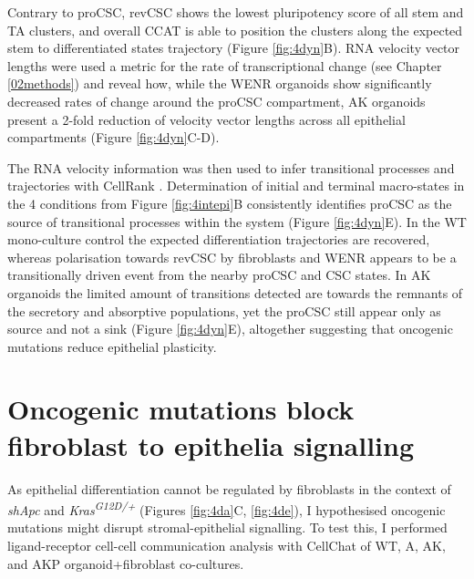 Contrary to proCSC, revCSC shows the lowest pluripotency score of all stem and TA clusters, and overall CCAT is able to position the clusters along the expected stem to differentiated states trajectory (Figure \ref{fig:4dyn}B). RNA velocity \cite{bergen_generalizing_2020} vector lengths were used a metric for the rate of transcriptional change (see Chapter \ref{02methods}) and reveal how, while the WENR organoids show significantly decreased rates of change around the proCSC compartment, AK organoids present a 2-fold reduction of velocity vector lengths across all epithelial compartments (Figure \ref{fig:4dyn}C-D).

The RNA velocity information was then used to infer transitional processes and trajectories with CellRank \cite{lange_cellrank_2022}. Determination of initial and terminal macro-states in the 4 conditions from Figure \ref{fig:4intepi}B consistently identifies proCSC as the source of transitional processes within the system (Figure \ref{fig:4dyn}E). In the WT mono-culture control the expected differentiation trajectories are recovered, whereas polarisation towards revCSC by fibroblasts and WENR appears to be a transitionally driven event from the nearby proCSC and CSC states. In AK organoids the limited amount of transitions detected are towards the remnants of the secretory and absorptive populations, yet the proCSC still appear only as source and not a sink (Figure \ref{fig:4dyn}E), altogether suggesting that oncogenic mutations reduce epithelial plasticity. 

\section{Oncogenic mutations block fibroblast to epithelia signalling}

As epithelial differentiation cannot be regulated by fibroblasts in the context of \textit{shApc} and \textit{Kras\textsuperscript{G12D/+}} (Figures \ref{fig:4da}C, \ref{fig:4de}), I hypothesised oncogenic mutations might disrupt stromal-epithelial signalling. To test this, I performed ligand-receptor cell-cell communication analysis with CellChat \cite{jin_inference_2021} of WT, A, AK, and AKP organoid+fibroblast co-cultures. 

